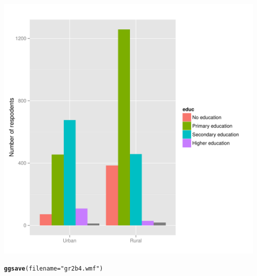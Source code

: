 \documentclass[DIV=calc, paper=a4, fontsize=11pt]{scrartcl}\usepackage[]{graphicx}\usepackage[]{color}
\makeatletter
\def\maxwidth{ %
  \ifdim\Gin@nat@width>\linewidth
    \linewidth
  \else
    \Gin@nat@width
  \fi
}
\newcommand{\hlstr}[1]{\textcolor[rgb]{0.192,0.494,0.8}{#1}}%
\newcommand{\hlstd}[1]{\textcolor[rgb]{0.345,0.345,0.345}{#1}}%
\newcommand{\hlkwc}[1]{\textcolor[rgb]{0.333,0.667,0.333}{#1}}%
\newcommand{\hlkwd}[1]{\textcolor[rgb]{0.737,0.353,0.396}{\textbf{#1}}}%
\newenvironment{kframe}{%
 \def\at@end@of@kframe{}%
 \ifinner\ifhmode%
  \def\at@end@of@kframe{\end{minipage}}%
  \begin{minipage}{\columnwidth}%
 \fi\fi%
 \def\FrameCommand##1{\hskip\@totalleftmargin \hskip-\fboxsep
 \colorbox{shadecolor}{##1}\hskip-\fboxsep
     \hskip-\linewidth \hskip-\@totalleftmargin \hskip\columnwidth}%
 \MakeFramed {\advance\hsize-\width
   \@totalleftmargin\z@ \linewidth\hsize
   \@setminipage}}%
 {\par\unskip\endMakeFramed%
 \at@end@of@kframe}
\newenvironment{knitrout}{}{} %
\makeatother
\begin{document}
\begin{knitrout}
\includegraphics[width=\maxwidth]{figure/unnamed-chunk-22} 
\begin{kframe}\begin{alltt}
\hlkwd{ggsave}\hlstd{(}\hlkwc{filename} \hlstd{=} \hlstr{"gr2b4.wmf"}\hlstd{)}
\end{alltt}



\end{kframe}
\end{knitrout}
\end{document}

